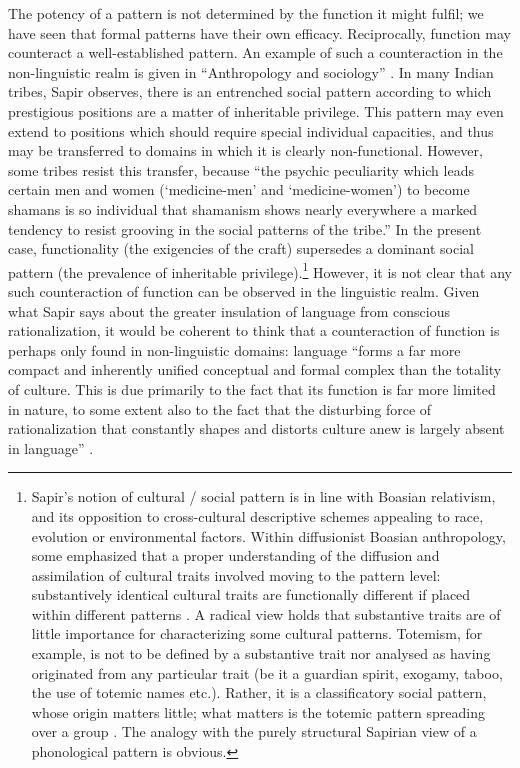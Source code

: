 \documentclass[output=paper]{langscibook}
\begin{document}
The potency of a pattern is not determined by the function it might fulfil; we have seen that formal patterns have their own efficacy. Reciprocally, function may counteract a well-established pattern. An example of such a counteraction in the non-linguistic realm is given in ``Anthropology and sociology'' \citep{Sapir1927a}. In many Indian tribes, Sapir observes, there is an entrenched social pattern according to which prestigious positions are a matter of inheritable privilege. This pattern may even extend to positions which should require special individual capacities, and thus may be transferred to domains in which it is clearly non-functional. However, some tribes resist this transfer, because ``the psychic peculiarity which leads certain men and women (`medicine-men' and `medicine-women') to become shamans is so individual that shamanism shows nearly everywhere a marked tendency to resist grooving in the social patterns of the tribe.'' In the present case, functionality (the exigencies of the craft) supersedes a dominant social pattern (the prevalence of inheritable privilege).\footnote{Sapir's notion of cultural / social pattern is in line with Boasian relativism, and its opposition to cross-cultural descriptive schemes appealing to race, evolution or environmental factors. Within diffusionist Boasian anthropology, some emphasized that a proper understanding of the diffusion and assimilation of cultural traits involved moving to the pattern level: substantively identical cultural traits are functionally different if placed within different patterns \citep{Wissler1917}. A radical view holds that substantive traits are of little importance for characterizing some cultural patterns. Totemism, for example, is not to be defined by a substantive trait nor analysed as having originated from any particular trait (be it a guardian spirit, exogamy, taboo, the use of totemic names etc.). Rather, it is a classificatory social pattern, whose origin matters little; what matters is the totemic pattern spreading over a group \citep{Goldenweiser1912}. The analogy with the purely structural Sapirian view of a phonological pattern is obvious.} However, it is not clear that any such counteraction of function can be observed in the linguistic realm. Given what Sapir says about the greater insulation of language from conscious rationalization, it would be coherent to think that a counteraction of function is perhaps only found in non-linguistic domains: language ``forms a far more compact and inherently unified conceptual and formal complex than the totality of culture. This is due primarily to the fact that its function is far more limited in nature, to some extent also to the fact that the disturbing force of rationalization that constantly shapes and distorts culture anew is largely absent in language'' \citep[432--433]{Sapir1916}. 
\end{document}
